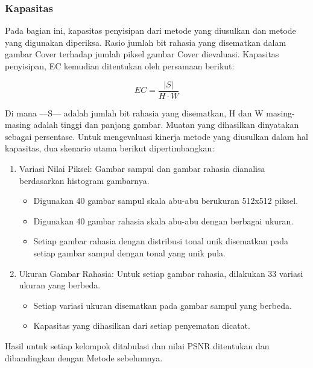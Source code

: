 \documentclass{ittelkom}
\begin{document}
\subsubsection{Kapasitas}

Pada bagian ini, kapasitas penyisipan dari metode yang diusulkan dan metode
yang digunakan diperiksa. Rasio jumlah bit rahasia yang disematkan dalam gambar
Cover terhadap jumlah piksel gambar Cover dievaluasi. Kapasitas penyisipan, EC
kemudian ditentukan oleh persamaan berikut:

\begin{equation}
    EC = \frac{|S|}{H \cdot W}
\end{equation}

Di mana —S— adalah jumlah bit rahasia yang disematkan, H dan W masing-masing
adalah tinggi dan panjang gambar. Muatan yang dihasilkan dinyatakan sebagai
persentase. Untuk mengevaluasi kinerja metode yang diusulkan dalam hal
kapasitas, dua skenario utama berikut dipertimbangkan:

\begin{enumerate}
    \item Variasi Nilai Piksel: Gambar sampul dan gambar rahasia dianalisa berdasarkan
          histogram gambarnya.
          \begin{itemize}
              \item Digunakan 40 gambar sampul skala abu-abu berukuran 512x512 piksel.
              \item Digunakan 40 gambar rahasia skala abu-abu dengan berbagai ukuran.
              \item Setiap gambar rahasia dengan distribusi tonal unik disematkan pada setiap
                    gambar sampul dengan tonal yang unik pula.
          \end{itemize}
    \item Ukuran Gambar Rahasia: Untuk setiap gambar rahasia, dilakukan 33 variasi ukuran
          yang berbeda.
          \begin{itemize}
              \item Setiap variasi ukuran disematkan pada gambar sampul yang berbeda.
              \item Kapasitas yang dihasilkan dari setiap penyematan dicatat.
          \end{itemize}
\end{enumerate}

Hasil untuk setiap kelompok ditabulasi dan nilai PSNR ditentukan dan
dibandingkan dengan Metode sebelumnya.
\end{document}
